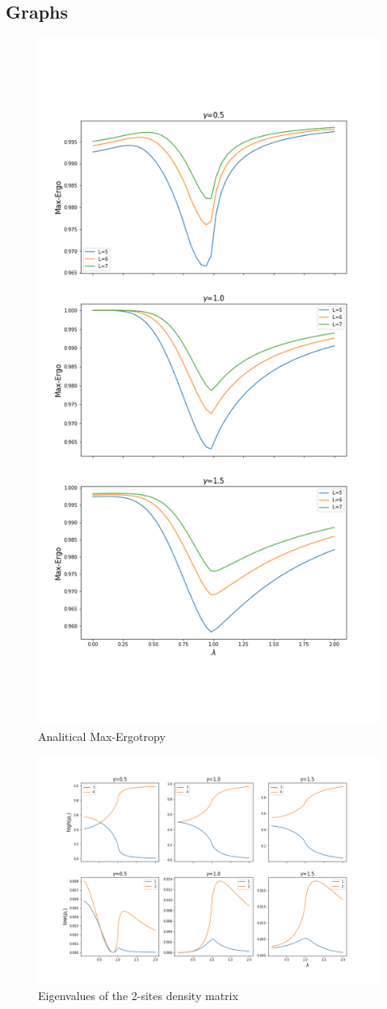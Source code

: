 \documentclass[12pt,a4paper]{book}
\theoremstyle{definition}
\begin{document}
\subsection{Graphs}
\begin{figure}[h]
	\centering
	\includegraphics[width=0.7\linewidth]{graphs/Maxerg_567_3gammas}
	\caption{Analitical Max-Ergotropy}
	\label{fig:maxerg5673gammas}
\end{figure}
\begin{figure}[h]
	\centering
	\includegraphics[width=\linewidth]{graphs/2sites_3gammas}
	\caption{Eigenvalues of the 2-sites density matrix}
	\label{fig:2sites3gammas}
\end{figure}
\end{document}
